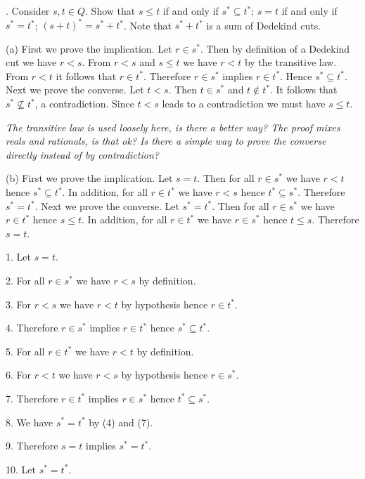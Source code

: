 . Consider $s,t\in Q$. Show that
\medskip
{} $s\le t$ if and only if $s^*\subseteq t^*$;
 $s=t$ if and only if $s^*=t^*$;
 $(s+t)^*=s^*+t^*$. Note that $s^*+t^*$ is a sum of Dedekind
cuts.

\bigskip
\noindent
(a)
First we prove the implication.
Let $r\in s^*$. Then by definition of a Dedekind cut we have $r<s$.
From $r<s$ and $s\le t$ we have $r<t$ by the transitive law.
From $r<t$ it follows that $r\in t^*$.
Therefore $r\in s^*$ implies $r\in t^*$. Hence $s^*\subseteq t^*$.
Next we prove the converse.
Let $t<s$. Then $t\in s^*$ and $t\not\in t^*$.
It follows that $s^*\not\subseteq t^*$, a contradiction.
Since $t<s$ leads to a contradiction we must have $s\le t$.

\bigskip
\noindent
{\it The transitive law is used loosely here, is there a better way?
The proof mixes reals and rationals, is that ok?
Is there a simple way to prove the converse directly instead of by
contradiction?}

\bigskip
\noindent
(b)
First we prove the implication.
Let $s=t$.
Then for all $r\in s^*$ we have $r<t$ hence $s^*\subseteq t^*$.
In addition, for all $r\in t^*$ we have $r<s$ hence $t^*\subseteq s^*$.
Therefore $s^*=t^*$.
Next we prove the converse.
Let $s^*=t^*$.
Then for all $r\in s^*$ we have $r\in t^*$ hence $s\le t$.
In addition, for all $r\in t^*$ we have $r\in s^*$ hence $t\le s$.
Therefore $s=t$.

\bigskip
\item{1.} Let $s=t$.

\item{2.} For all $r\in s^*$ we have $r<s$ by definition.
\item{3.} For $r<s$ we have $r<t$ by hypothesis hence $r\in t^*$.
\item{4.} Therefore $r\in s^*$ implies $r\in t^*$ hence $s^*\subseteq t^*$.

\item{5.} For all $r\in t^*$ we have $r<t$ by definition.
\item{6.} For $r<t$ we have $r<s$ by hypothesis hence $r\in s^*$.
\item{7.} Therefore $r\in t^*$ implies $r\in s^*$ hence $t^*\subseteq s^*$.

\item{8.} We have $s^*=t^*$ by (4) and (7).
\item{9.} Therefore $s=t$ implies $s^*=t^*$.

\item{10.} Let $s^*=t^*$.

